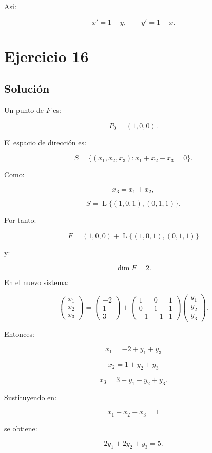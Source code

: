 \documentclass[11pt,a4paper]{article}
\newcommand{\Span}{\operatorname{L}}
\begin{document}
Así:

\[
\boxed{
x'=1-y,
\qquad
y'=1-x.
}
\]

\section{Ejercicio 16}
\subsection{Solución}

Un punto de $F$ es:

\[
P_0=(1,0,0).
\]

El espacio de dirección es:

\[
S=
\{(x_1,x_2,x_3):x_1+x_2-x_3=0\}.
\]

Como:

\[
x_3=x_1+x_2,
\]

\[
S=
\Span\{(1,0,1),(0,1,1)\}.
\]

Por tanto:

\[
\boxed{
F=
(1,0,0)
+
\Span\{(1,0,1),(0,1,1)\}
}
\]

y:

\[
\boxed{\dim F=2.}
\]

En el nuevo sistema:

\[
\begin{pmatrix}
x_1\\x_2\\x_3
\end{pmatrix}
=
\begin{pmatrix}
-2\\1\\3
\end{pmatrix}
+
\begin{pmatrix}
1&0&1\\
0&1&1\\
-1&-1&1
\end{pmatrix}
\begin{pmatrix}
y_1\\y_2\\y_3
\end{pmatrix}.
\]

Entonces:

\[
x_1=-2+y_1+y_3
\]

\[
x_2=1+y_2+y_3
\]

\[
x_3=3-y_1-y_2+y_3.
\]

Sustituyendo en:

\[
x_1+x_2-x_3=1
\]

se obtiene:

\[
\boxed{
2y_1+2y_2+y_3=5.
}
\]
\end{document}
